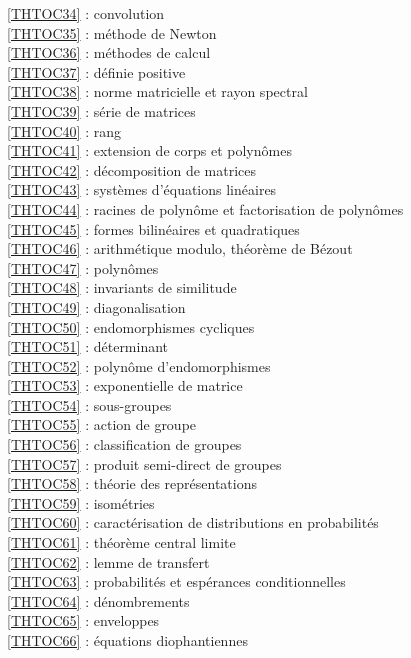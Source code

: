 \ref {THTOC34} : convolution\\
\ref {THTOC35} : méthode de Newton\\
\ref {THTOC36} : méthodes de calcul\\
\ref {THTOC37} : définie positive\\
\ref {THTOC38} : norme matricielle et rayon spectral\\
\ref {THTOC39} : série de matrices\\
\ref {THTOC40} : rang\\
\ref {THTOC41} : extension de corps et polynômes\\
\ref {THTOC42} : décomposition de matrices\\
\ref {THTOC43} : systèmes d'équations linéaires\\
\ref {THTOC44} : racines de polynôme et factorisation de polynômes\\
\ref {THTOC45} : formes bilinéaires et quadratiques\\
\ref {THTOC46} : arithmétique modulo, théorème de Bézout\\
\ref {THTOC47} : polynômes\\
\ref {THTOC48} : invariants de similitude\\
\ref {THTOC49} : diagonalisation\\
\ref {THTOC50} : endomorphismes cycliques\\
\ref {THTOC51} : déterminant\\
\ref {THTOC52} : polynôme d'endomorphismes\\
\ref {THTOC53} : exponentielle de matrice\\
\ref {THTOC54} : sous-groupes\\
\ref {THTOC55} : action de groupe\\
\ref {THTOC56} : classification de groupes\\
\ref {THTOC57} : produit semi-direct de groupes\\
\ref {THTOC58} : théorie des représentations\\
\ref {THTOC59} : isométries\\
\ref {THTOC60} : caractérisation de distributions en probabilités\\
\ref {THTOC61} : théorème central limite\\
\ref {THTOC62} : lemme de transfert\\
\ref {THTOC63} : probabilités et espérances conditionnelles\\
\ref {THTOC64} : dénombrements\\
\ref {THTOC65} : enveloppes\\
\ref {THTOC66} : équations diophantiennes\\
